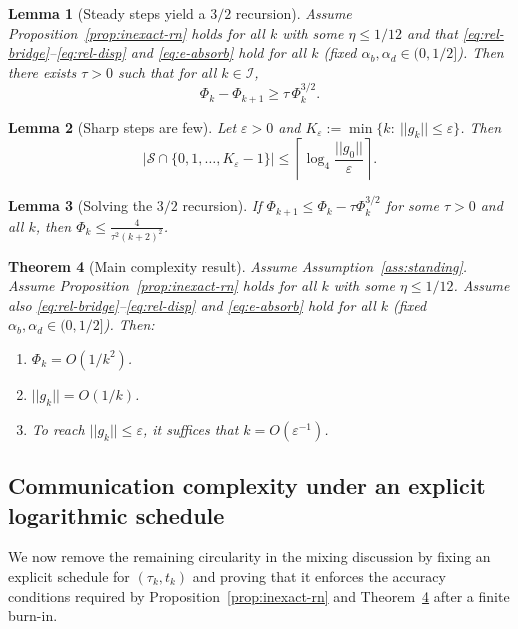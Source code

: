 \documentclass[11pt,a4paper]{article}
\def\cO{O}%
\def\norm#1{||#1||}%
\newtheorem{theorem}{Theorem}[section]
\newtheorem{lemma}[theorem]{Lemma}
\newcommand{\norm}[1]{\left\|#1\right\|}
\newcommand{\cO}{\mathcal{O}}
\begin{document}
	\begin{lemma}[Steady steps yield a $3/2$ recursion]\label{lem:steady-rec}
		Assume Proposition~\ref{prop:inexact-rn} holds for all $k$ with some $\eta\le 1/12$ and that
		\eqref{eq:rel-bridge}--\eqref{eq:rel-disp} and \eqref{eq:e-absorb} hold for all $k$ (fixed $\alpha_b,\alpha_d\in(0,1/2]$).
		Then there exists $\tau>0$ such that for all $k\in\mathcal I$,
		\[
		\Phi_k-\Phi_{k+1}\ge \tau\,\Phi_k^{3/2}.
		\]
	\end{lemma}
	
	\begin{lemma}[Sharp steps are few]\label{lem:sharp-count}
		Let $\varepsilon>0$ and $K_\varepsilon:=\min\{k:\ \norm{g_k}\le \varepsilon\}$.
		Then
		\[
		|\mathcal S\cap\{0,1,\dots,K_\varepsilon-1\}|
		\le \left\lceil \log_4\frac{\norm{g_0}}{\varepsilon}\right\rceil.
		\]
	\end{lemma}
	
	\begin{lemma}[Solving the $3/2$ recursion]\label{lem:telescoping}
		If $\Phi_{k+1}\le \Phi_k-\tau \Phi_k^{3/2}$ for some $\tau>0$ and all $k$, then
		$\Phi_k\le \frac{4}{\tau^2(k+2)^2}$.
	\end{lemma}
	
	\begin{theorem}[Main complexity result]\label{thm:main}
		Assume Assumption~\ref{ass:standing}.
		Assume Proposition~\ref{prop:inexact-rn} holds for all $k$ with some $\eta\le 1/12$.
		Assume also \eqref{eq:rel-bridge}--\eqref{eq:rel-disp} and \eqref{eq:e-absorb} hold for all $k$ (fixed $\alpha_b,\alpha_d\in(0,1/2]$).
		Then:
		\begin{enumerate}[leftmargin=1.2em,itemsep=2pt]
			\item $\Phi_k=\cO(1/k^2)$.
			\item $\norm{g_k}=\cO(1/k)$.
			\item To reach $\norm{g_k}\le \varepsilon$, it suffices that $k=\cO(\varepsilon^{-1})$.
		\end{enumerate}
	\end{theorem}
	
	\subsection{Communication complexity under an explicit logarithmic schedule}\label{ssec:comm_schedule}
	We now remove the remaining circularity in the mixing discussion by fixing an explicit schedule for
	$(\tau_k,t_k)$ and proving that it enforces the accuracy conditions required by
	Proposition~\ref{prop:inexact-rn} and Theorem~\ref{thm:main} after a finite burn-in.
	
\end{document}
